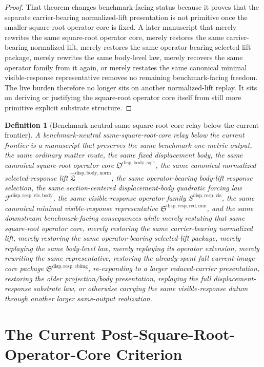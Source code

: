 \documentclass[11pt]{article}
\newcommand{\NormalizedLiftPackage}{\widehat{\mathfrak L}^{\mathrm{disp,body,norm}}}
\newcommand{\SquareRootOperatorCore}{\mathfrak O^{\mathrm{disp,body,sqrt}}}
\newcommand{\VisibleBodyForcingLaw}{\mathscr F^{\mathrm{disp,resp,vis,body}}}
\newcommand{\VisibleResponseOperator}{S^{\mathrm{disp,resp,vis}}}
\newcommand{\MinimalReducedStructure}{\mathfrak S^{\mathrm{disp,resp,red,min}}}
\newcommand{\CurrentBodyImageCore}{\mathfrak S^{\mathrm{disp,resp,cbimg}}}
\newtheorem{definition}{Definition}
\begin{document}
\begin{proof}
That theorem changes benchmark-facing status because it proves that the separate carrier-bearing normalized-lift presentation is not primitive once the smaller square-root operator core is fixed. A later manuscript that merely rewrites the same square-root operator core, merely restores the same carrier-bearing normalized lift, merely restores the same operator-bearing selected-lift package, merely rewrites the same body-level law, merely recovers the same operator family from it again, or merely restates the same canonical minimal visible-response representative removes no remaining benchmark-facing freedom. The live burden therefore no longer sits on another normalized-lift replay. It sits on deriving or justifying the square-root operator core itself from still more primitive explicit substrate structure.
\end{proof}

\begin{definition}[Benchmark-neutral same-square-root-core relay below the current frontier]
A \emph{benchmark-neutral same-square-root-core relay below the current frontier} is a manuscript that preserves the same benchmark one-metric output, the same ordinary matter route, the same fixed displacement body, the same canonical square-root operator core \(\SquareRootOperatorCore\), the same canonical normalized selected-response lift \(\NormalizedLiftPackage\), the same operator-bearing body-lift response selection, the same section-centered displacement-body quadratic forcing law \(\VisibleBodyForcingLaw\), the same visible-response operator family \(\VisibleResponseOperator\), the same canonical minimal visible-response representative \(\MinimalReducedStructure\), and the same downstream benchmark-facing consequences while merely restating that same square-root operator core, merely restoring the same carrier-bearing normalized lift, merely restoring the same operator-bearing selected-lift package, merely replaying the same body-level law, merely replaying its operator extension, merely rewriting the same representative, restoring the already-spent full current-image-core package \(\CurrentBodyImageCore\), re-expanding to a larger reduced-carrier presentation, restoring the older projection/body presentation, replaying the full displacement-response substrate law, or otherwise carrying the same visible-response datum through another larger same-output realization.
\end{definition}

\section{The Current Post-Square-Root-Operator-Core Criterion}
\end{document}
